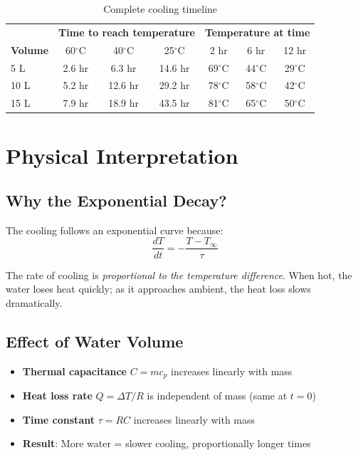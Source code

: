 \documentclass[11pt]{article}
\newcommand{\degC}{$^\circ$C}
\begin{document}
\begin{table}[H]
\centering
\caption{Complete cooling timeline}
\begin{tabular}{l|ccc|ccc}
\toprule
& \multicolumn{3}{c|}{\textbf{Time to reach temperature}} & \multicolumn{3}{c}{\textbf{Temperature at time}} \\
\textbf{Volume} & 60\degC & 40\degC & 25\degC & 2 hr & 6 hr & 12 hr \\
\midrule
5 L & 2.6 hr & 6.3 hr & 14.6 hr & 69\degC & 44\degC & 29\degC \\
10 L & 5.2 hr & 12.6 hr & 29.2 hr & 78\degC & 58\degC & 42\degC \\
15 L & 7.9 hr & 18.9 hr & 43.5 hr & 81\degC & 65\degC & 50\degC \\
\bottomrule
\end{tabular}
\end{table}

\section{Physical Interpretation}

\subsection{Why the Exponential Decay?}

The cooling follows an exponential curve because:
\begin{equation}
    \frac{dT}{dt} = -\frac{T - T_\infty}{\tau}
\end{equation}

The rate of cooling is \textit{proportional to the temperature difference}. When hot, the water loses heat quickly; as it approaches ambient, the heat loss slows dramatically.

\subsection{Effect of Water Volume}

\begin{itemize}
    \item \textbf{Thermal capacitance} $C = mc_p$ increases linearly with mass
    \item \textbf{Heat loss rate} $Q = \Delta T / R$ is independent of mass (same at $t=0$)
    \item \textbf{Time constant} $\tau = RC$ increases linearly with mass
    \item \textbf{Result}: More water = slower cooling, proportionally longer times
\end{itemize}
\end{document}
